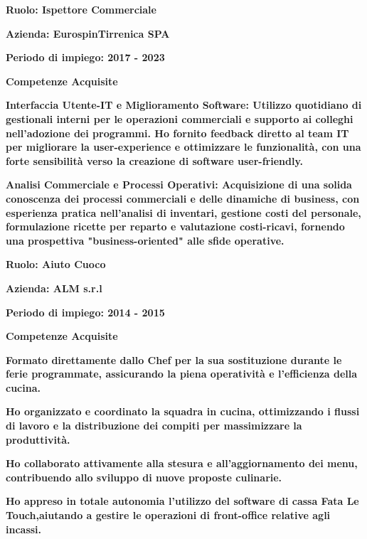 \documentclass{article}
\newenvironment{listaIdentazione}[1]{
			\begin{list}{}{
			  \setlength{\leftmargin}{#1} %
			  \setlength{\itemsep}{0pt}	%
			  \setlength{\parskip}{0pt} %
			  \setlength{\parsep}{0pt} %
			  \setlength{\labelwidth}{0pt} %
			  \setlength{\labelsep}{0pt} %
			  \renewcommand{\makelabel}[1]{} %
			  }
			}{\end{list}}
\newcommand{\spaziocorto}{\\[0.1cm]}
\newcommand{\spaziolungo}{\\[0.3cm]}
\newcommand{\spaziopiulungo}{\\[0.8cm]}
\begin{document}
\begin{flushleft}
		\textbf{\Large{Ruolo: Ispettore Commerciale}}
			\spaziocorto
			\begin{listaIdentazione}{0.5cm}
			\item {\textbf{\Large{Azienda: EurospinTirrenica SPA }}}
			\spaziocorto
			\item {\textbf{\Large{Periodo di impiego: 2017 - 2023}}}
			\spaziocorto
			\item {\textbf{\Large{Competenze Acquisite}}}
			\spaziolungo
			\item {\textbf{\Large{Interfaccia Utente-IT e Miglioramento Software:
			Utilizzo quotidiano di gestionali interni per le operazioni commerciali e
			supporto ai colleghi nell'adozione dei programmi. Ho fornito feedback diretto
			al team IT per migliorare la user-experience e ottimizzare le funzionalità,
			con una forte sensibilità verso la creazione di software user-friendly.}}}
			\spaziolungo
			\item {\textbf{\Large{Analisi Commerciale e Processi Operativi: Acquisizione
			di una solida conoscenza dei processi commerciali e delle dinamiche di
			business, con esperienza pratica nell'analisi di inventari, gestione costi
			del personale, formulazione ricette per reparto e valutazione costi-ricavi,
			fornendo una prospettiva "business-oriented" alle sfide operative.}}}
			\spaziopiulungo
			\end{listaIdentazione}
			
		\textbf{\Large{Ruolo: Aiuto Cuoco }}
			\spaziocorto
			\begin{listaIdentazione}{0.5cm}
			\item {\textbf{\Large{Azienda: ALM s.r.l }}}
			\spaziocorto
			\item {\textbf{\Large{Periodo di impiego: 2014 - 2015}}}
			\spaziocorto
			\item {\textbf{\Large{Competenze Acquisite}}}
			\spaziolungo
			\item {\textbf{\Large{Formato direttamente dallo Chef per la sua sostituzione durante le ferie programmate, assicurando la piena operatività e l'efficienza della cucina.}}}
			\spaziolungo
    		\item {\textbf{\Large{Ho organizzato e coordinato la squadra in cucina, ottimizzando i flussi di lavoro e la distribuzione dei compiti per massimizzare la produttività.}}}
    		\spaziolungo
    		\item {\textbf{\Large{Ho collaborato attivamente alla stesura e all'aggiornamento dei menu, contribuendo allo sviluppo di nuove proposte culinarie.}}}
    		\spaziolungo
    		\item {\textbf{\Large{Ho appreso in totale autonomia l'utilizzo del software di cassa \textbf{Fata Le Touch},aiutando a gestire le operazioni di front-office relative agli incassi.}}}
    		\spaziopiulungo
			\end{listaIdentazione}
			

\end{flushleft}
\end{document}
